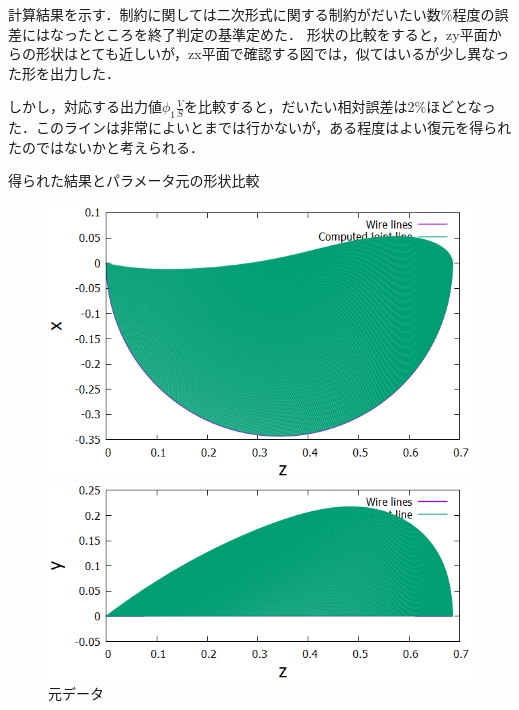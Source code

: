 \documentclass[11pt]{jsarticle}
\begin{document}
			計算結果を示す．制約に関しては二次形式に関する制約がだいたい数$ \% $程度の誤差にはなったところを終了判定の基準定めた．
			形状の比較をすると，zy平面からの形状はとても近しいが，zx平面で確認する図では，似てはいるが少し異なった形を出力した．
			
			しかし，対応する出力値$ \phi_1 \frac{V}{S} $を比較すると，だいたい相対誤差は2$ \% $ほどとなった．このラインは非常によいとまでは行かないが，ある程度はよい復元を得られたのではないかと考えられる．
			
			
			得られた結果とパラメータ元の形状比較
			\begin{figure}
				\begin{minipage}{0.5\hsize}
					\centering
					\includegraphics[width = \columnwidth]{./figure/ObtainedRidgeLinefromz-x.png}
				\end{minipage}
				\begin{minipage}{0.5\hsize}
					\centering
					\includegraphics[width = \columnwidth]{./figure/ObtainedRidgeLinefromz-y.png}
				\end{minipage}
				\caption{元データ}
			\end{figure}
\end{document}
